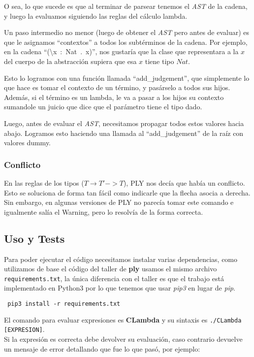 \documentclass[spanish, a4paper]{article}
\begin{document}
O sea, lo que sucede es que al terminar de parsear tenemos el \textit{AST} de la cadena, y luego la evaluamos siguiendo las reglas del cálculo lambda.

Un paso intermedio no menor (luego de obtener el \textit{AST} pero antes de evaluar) es que le asignamos ``contextos'' a todos los subtérminos de la cadena. Por ejemplo, en la cadena ``(\textbackslash x\ :\ Nat\ .\ x)'', nos gustaría que la clase que representara a la $x$ del cuerpo de la abstracción supiera que esa $x$ tiene tipo $Nat$.

Esto lo logramos con una función llamada ``add\_judgement'', que simplemente lo que hace es tomar el contexto de un término, y pasárselo a todos sus hijos. Además, si el término es un lambda, le va a pasar a los hijos su contexto sumandole un juicio que dice que el parámetro tiene el tipo dado.

Luego, antes de evaluar el \textit{AST}, necesitamos propagar todos estos valores hacia abajo. Logramos esto haciendo una llamada al ``add\_judgement'' de la raíz con valores dummy.

\subsubsection{Conflicto}

En las reglas de los tipos ($T \rightarrow T' -> T$), PLY nos decía que había un conflicto. Esto se soluciona de forma tan fácil como indicarle que la flecha asocia a derecha. Sin embargo, en algunas versiones de PLY no parecía tomar este comando e igualmente salía el Warning, pero lo resolvía de la forma correcta.

\subsection{Uso y Tests}
Para poder ejecutar el código necesitamos instalar varias dependencias, como utilizamos de base el código del taller de \textbf{ply} usamos el mismo archivo \verb|requirements.txt|, la única diferencia con el taller es que el trabajo está implementado en Python3 por lo que tenemos que usar \textit{pip3} en lugar de \textit{pip}.

\verb| pip3 install -r requirements.txt |

El comando para evaluar expresiones es \textbf{CLambda} y su sintaxis es \verb|./CLambda [EXPRESION]|.\\
Si la expresión es correcta debe devolver su evaluación, caso contrario devuelve un mensaje de error detallando que fue lo que pasó, por ejemplo:
\end{document}
